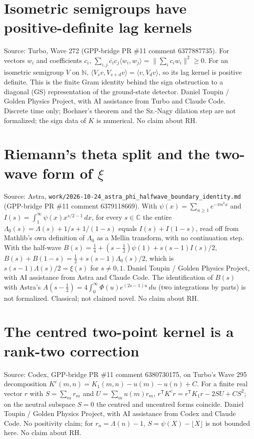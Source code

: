 \documentclass{report}
\theoremstyle{definition}
\begin{document}
\begin{itemize}
\begin{itemize}
\section{Isometric semigroups have positive-definite lag kernels}
Source: Turbo, Wave 272 (GPP-bridge PR \#11 comment 6377887735). For vectors $w_i$ and coefficients $c_i$, $\sum_{i,j}\overline{c_i}c_j\langle w_i,w_j\rangle=\|\sum_ic_iw_i\|^2\ge0$.
For an isometric semigroup $V$ on $\mathbb N$, $\langle V_sv,V_{s+d}v\rangle=\langle v,V_dv\rangle$, so its lag kernel is positive definite. This is the finite Gram identity behind
the sign obstruction to a diagonal (GS) representation of the ground-state detector. Daniel Toupin / Golden Physics Project, with AI assistance
from Turbo and Claude Code. Discrete time only; Bochner's theorem and the Sz.-Nagy dilation step are not formalized; the sign data of $K$ is numerical. No
claim about RH.

\section{Riemann's theta split and the two-wave form of \texorpdfstring{$\xi$}{xi}}
Source: Astra, \texttt{work/2026-10-24\_astra\_phi\_halfwave\_boundary\_identity.md} (GPP-bridge PR \#11 comment 6379118669). With $\psi(x)=\sum_{n\ge1}e^{-\pi n^2x}$ and
$I(s)=\int_1^\infty\psi(x)x^{s/2-1}\,dx$, for every $s\in\mathbb C$ the entire $\Lambda_0(s)=\Lambda(s)+1/s+1/(1-s)$ equals $I(s)+I(1-s)$, read off from Mathlib's own
definition of $\Lambda_0$ as a Mellin transform, with no continuation step. With the half-wave $B(s)=\tfrac14+(s-\tfrac12)\psi(1)+s(s-1)I(s)/2$, $B(s)+B(1-s)=\tfrac12+s(s-1)\Lambda_0(s)/2$,
which is $s(s-1)\Lambda(s)/2=\xi(s)$ for $s\ne0,1$. Daniel Toupin / Golden Physics Project, with AI assistance from Astra and Claude Code. The identification of $B(s)$ with
Astra's $A(s-\tfrac12)=4\int_0^\infty\Phi(u)e^{(2s-1)u}\,du$ (two integrations by parts) is not formalized. Classical; not claimed novel. No claim about RH.

\section{The centred two-point kernel is a rank-two correction}
Source: Codex, GPP-bridge PR \#11 comment 6380730175, on Turbo's Wave 295 decomposition $K^c(m,n)=K_1(m,n)-u(m)-u(n)+C$. For a finite real vector $r$ with
$S=\sum_mr_m$ and $U=\sum_mu(m)r_m$, $r^{\mathsf T}K^cr=r^{\mathsf T}K_1r-2SU+CS^2$; on the neutral subspace $S=0$ the centred and uncentred forms coincide. Daniel Toupin /
Golden Physics Project, with AI assistance from Codex and Claude Code. No positivity claim; for $r_n=\Lambda(n)-1$, $S=\psi(X)-\lfloor X\rfloor$ is not bounded here. No claim about RH.

\end{itemize}
\end{itemize}
\end{document}
